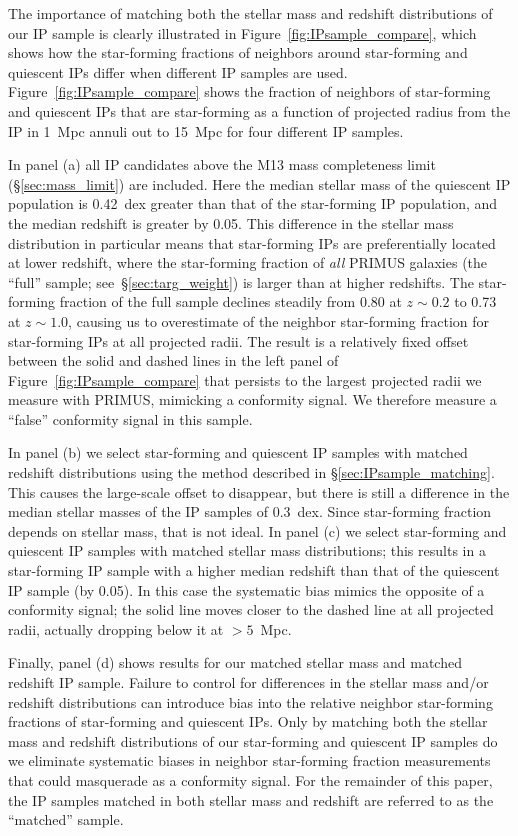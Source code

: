 The importance of matching both the stellar mass and redshift distributions of our 
IP sample is clearly illustrated in Figure~\ref{fig:IPsample_compare}, which shows 
how the star-forming fractions of neighbors around star-forming and quiescent IPs 
differ when different IP samples are used.
Figure~\ref{fig:IPsample_compare} shows the fraction of neighbors of star-forming 
and quiescent IPs that are star-forming as a function of projected radius from the 
IP in 1~Mpc annuli out to 15~Mpc for four different IP samples.
%

In panel (a) all IP candidates above the M13 mass completeness limit 
(\S\ref{sec:mass_limit}) are included.
Here the median stellar mass of the quiescent IP population is 0.42~dex greater 
than that of the star-forming IP population, and the median redshift is greater 
by 0.05.
This difference in the stellar mass distribution in particular means that 
star-forming IPs are preferentially located at lower redshift, where the star-forming fraction of \emph{all} PRIMUS galaxies (the ``full'' sample; see~\S\ref{sec:targ_weight}) is larger than at higher redshifts.  The star-forming fraction of the full sample declines steadily from 0.80 at $z\sim0.2$ to 0.73 at $z\sim1.0$, causing us to overestimate of the neighbor star-forming fraction for star-forming IPs at all projected radii.
The result is a relatively fixed offset between the solid and dashed lines in the 
left panel of Figure~\ref{fig:IPsample_compare} that persists to the largest 
projected radii we measure with PRIMUS, mimicking a conformity signal.  We therefore
measure a ``false'' conformity signal in this sample.

In panel (b) we select star-forming and quiescent IP samples with matched redshift 
distributions using the method described in \S\ref{sec:IPsample_matching}.  This 
causes the large-scale offset to disappear, but there is still a difference in the 
median stellar masses of the IP samples of 0.3~dex.  Since star-forming fraction depends on stellar mass, that is not ideal. 
In panel (c) we select star-forming and quiescent IP samples with matched stellar mass distributions; this results in a star-forming IP sample with a higher median 
redshift than that of the quiescent IP sample (by 0.05).
In this case the systematic bias mimics the opposite of a conformity signal; the solid line moves closer to the dashed line at all projected radii, actually dropping below it at $>5$~Mpc.

Finally, panel (d) shows results for our matched stellar mass and matched redshift IP sample.
Failure to control for differences in the stellar mass and/or redshift distributions 
can introduce bias into the relative neighbor star-forming fractions of star-forming and quiescent IPs.
Only by matching both the stellar mass and redshift distributions of our star-forming and quiescent IP samples do we eliminate systematic biases in neighbor star-forming fraction measurements that could masquerade as a conformity signal.
For the remainder of this paper, the IP samples matched in both stellar mass and redshift are referred to as the ``matched'' sample.


